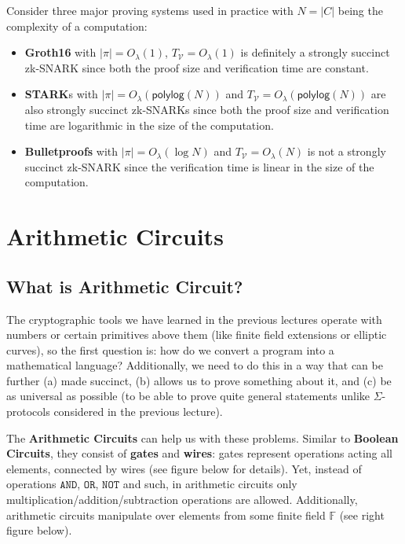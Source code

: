 \documentclass[../lecture-notes.tex]{subfiles}
\begin{document}
\begin{example}
    Consider three major proving systems used in practice with $N=|C|$ being the complexity of a computation:
    \begin{itemize}
        \item \textbf{Groth16} with $|\pi| = O_{\lambda}(1)$, $T_{\mathcal{V}} = O_{\lambda}(1)$ is definitely a strongly succinct zk-SNARK since both the proof size and verification time are constant.
        \item \textbf{STARK}s with $|\pi| = O_{\lambda}(\mathsf{polylog}(N))$ and $T_{\mathcal{V}} = O_{\lambda}(\mathsf{polylog}(N))$ are also strongly succinct zk-SNARKs since both the proof size and verification time are logarithmic in the size of the computation.
        \item \textbf{Bulletproofs} with $|\pi| = O_{\lambda}(\log N)$ and $T_{\mathcal{V}} = O_{\lambda}(N)$ is not a strongly succinct zk-SNARK since the verification time is linear in the size of the computation.
    \end{itemize}
\end{example}

\section{Arithmetic Circuits}

\subsection{What is Arithmetic Circuit?}
The cryptographic tools we have learned in the previous lectures operate with numbers or certain 
primitives above them (like finite field extensions or elliptic curves), so the first question is: how do we convert a program into a mathematical 
language? Additionally, we need to do this in a way that can be further (a) made succinct, (b) allows us to prove 
something about it, and (c) be as universal as possible (to be able to prove quite general statements unlike $\Sigma$-protocols considered in the previous lecture).

The \textbf{Arithmetic Circuits} can help us with these problems. Similar to \textbf{Boolean Circuits}, they consist of \textbf{gates} and 
\textbf{wires}: gates represent operations acting all elements, connected by wires (see figure below for details). Yet, instead of operations $\mathtt{AND}$, $\mathtt{OR}$, $\mathtt{NOT}$ and such, in arithmetic circuits only 
multiplication/addition/subtraction operations are allowed. Additionally, arithmetic circuits manipulate over elements
from some finite field $\mathbb{F}$ (see right figure below).
\end{document}

